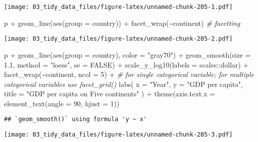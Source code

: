 \documentclass[
]{book}
\newenvironment{Shaded}{\begin{snugshade}}{\end{snugshade}}
\newcommand{\AttributeTok}[1]{\textcolor[rgb]{0.77,0.63,0.00}{#1}}
\newcommand{\CommentTok}[1]{\textcolor[rgb]{0.56,0.35,0.01}{\textit{#1}}}
\newcommand{\ConstantTok}[1]{\textcolor[rgb]{0.00,0.00,0.00}{#1}}
\newcommand{\DecValTok}[1]{\textcolor[rgb]{0.00,0.00,0.81}{#1}}
\newcommand{\FloatTok}[1]{\textcolor[rgb]{0.00,0.00,0.81}{#1}}
\newcommand{\FunctionTok}[1]{\textcolor[rgb]{0.00,0.00,0.00}{#1}}
\newcommand{\NormalTok}[1]{#1}
\newcommand{\SpecialCharTok}[1]{\textcolor[rgb]{0.00,0.00,0.00}{#1}}
\newcommand{\StringTok}[1]{\textcolor[rgb]{0.31,0.60,0.02}{#1}}
\begin{document}
\texttt{[image: 03\_tidy\_data\_files/figure-latex/unnamed-chunk-205-1.pdf]}

\begin{Shaded}
\begin{Highlighting}[]
\NormalTok{p }\SpecialCharTok{+} \FunctionTok{geom\_line}\NormalTok{(}\FunctionTok{aes}\NormalTok{(}\AttributeTok{group =}\NormalTok{ country)) }\SpecialCharTok{+} \FunctionTok{facet\_wrap}\NormalTok{(}\SpecialCharTok{\textasciitilde{}}\NormalTok{continent) }\CommentTok{\# facetting}
\end{Highlighting}
\end{Shaded}

\texttt{[image: 03\_tidy\_data\_files/figure-latex/unnamed-chunk-205-2.pdf]}

\begin{Shaded}
\begin{Highlighting}[]
\NormalTok{p }\SpecialCharTok{+} \FunctionTok{geom\_line}\NormalTok{(}\FunctionTok{aes}\NormalTok{(}\AttributeTok{group =}\NormalTok{ country), }\AttributeTok{color =} \StringTok{"gray70"}\NormalTok{) }\SpecialCharTok{+}
  \FunctionTok{geom\_smooth}\NormalTok{(}\AttributeTok{size =} \FloatTok{1.1}\NormalTok{, }\AttributeTok{method =} \StringTok{"loess"}\NormalTok{, }\AttributeTok{se =} \ConstantTok{FALSE}\NormalTok{) }\SpecialCharTok{+}
  \FunctionTok{scale\_y\_log10}\NormalTok{(}\AttributeTok{labels =}\NormalTok{ scales}\SpecialCharTok{::}\NormalTok{dollar) }\SpecialCharTok{+}
  \FunctionTok{facet\_wrap}\NormalTok{(}\SpecialCharTok{\textasciitilde{}}\NormalTok{continent, }\AttributeTok{ncol =} \DecValTok{5}\NormalTok{) }\SpecialCharTok{+} \CommentTok{\# for single categorical variable; for multiple categorical variables use facet\_grid()}
  \FunctionTok{labs}\NormalTok{(}
    \AttributeTok{x =} \StringTok{"Year"}\NormalTok{,}
    \AttributeTok{y =} \StringTok{"GDP per capita"}\NormalTok{,}
    \AttributeTok{title =} \StringTok{"GDP per capita on Five continents"}
\NormalTok{  ) }\SpecialCharTok{+}
  \FunctionTok{theme}\NormalTok{(}\AttributeTok{axis.text.x =} \FunctionTok{element\_text}\NormalTok{(}\AttributeTok{angle =} \DecValTok{90}\NormalTok{, }\AttributeTok{hjust =} \DecValTok{1}\NormalTok{))}
\end{Highlighting}
\end{Shaded}

\begin{verbatim}
## `geom_smooth()` using formula 'y ~ x'
\end{verbatim}

\texttt{[image: 03\_tidy\_data\_files/figure-latex/unnamed-chunk-205-3.pdf]}
\end{document}
